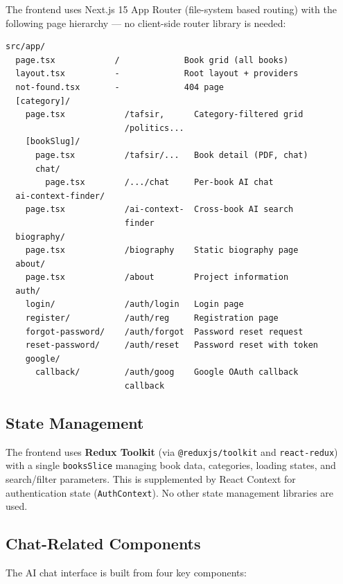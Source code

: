 \documentclass[11pt,a4paper]{article}
\begin{document}
The frontend uses Next.js 15 App Router (file-system based routing) with the following page hierarchy --- no client-side router library is needed:

\begin{verbatim}
src/app/
  page.tsx            /             Book grid (all books)
  layout.tsx          -             Root layout + providers
  not-found.tsx       -             404 page
  [category]/
    page.tsx            /tafsir,      Category-filtered grid
                        /politics...
    [bookSlug]/
      page.tsx          /tafsir/...   Book detail (PDF, chat)
      chat/
        page.tsx        /.../chat     Per-book AI chat
  ai-context-finder/
    page.tsx            /ai-context-  Cross-book AI search
                        finder
  biography/
    page.tsx            /biography    Static biography page
  about/
    page.tsx            /about        Project information
  auth/
    login/              /auth/login   Login page
    register/           /auth/reg     Registration page
    forgot-password/    /auth/forgot  Password reset request
    reset-password/     /auth/reset   Password reset with token
    google/
      callback/         /auth/goog    Google OAuth callback
                        callback
\end{verbatim}

\subsection{State Management}

The frontend uses \textbf{Redux Toolkit} (via \texttt{@reduxjs/toolkit} and \texttt{react-redux}) with a single \texttt{booksSlice} managing book data, categories, loading states, and search/filter parameters. This is supplemented by React Context for authentication state (\texttt{AuthContext}). No other state management libraries are used.

\subsection{Chat-Related Components}

The AI chat interface is built from four key components:
\end{document}

